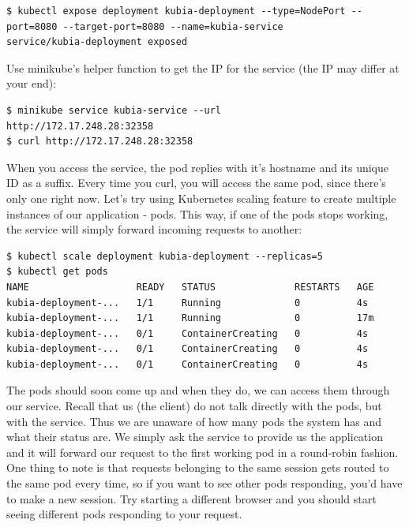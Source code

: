 \documentclass[a4paper,10pt]{article}
\begin{document}
\begin{lstlisting}[numbers=none, basicstyle=\mdseries]
$ kubectl expose deployment kubia-deployment --type=NodePort --port=8080 --target-port=8080 --name=kubia-service
service/kubia-deployment exposed
\end{lstlisting}

Use minikube's helper function to get the IP for the service (the IP may differ at your end):

\begin{lstlisting}[numbers=none, basicstyle=\mdseries]
$ minikube service kubia-service --url
http://172.17.248.28:32358
$ curl http://172.17.248.28:32358
\end{lstlisting}

When you access the service, the pod replies with it's hostname and its unique ID as a suffix. Every time you curl, you will access the same pod, since there's only one right now. Let's try using Kubernetes scaling feature to create multiple instances of our application - pods. This way, if one of the pods stops working, the service will simply forward incoming requests to another:

\newpage

\begin{lstlisting}[numbers=none, basicstyle=\mdseries]
$ kubectl scale deployment kubia-deployment --replicas=5
$ kubectl get pods
NAME                   READY   STATUS              RESTARTS   AGE
kubia-deployment-...   1/1     Running             0          4s
kubia-deployment-...   1/1     Running             0          17m
kubia-deployment-...   0/1     ContainerCreating   0          4s
kubia-deployment-...   0/1     ContainerCreating   0          4s
kubia-deployment-...   0/1     ContainerCreating   0          4s
\end{lstlisting}

The pods should soon come up and when they do, we can access them through our service. Recall that us (the client) do not talk directly with the pods, but with the service. Thus we are unaware of how many pods the system has and what their status are. We simply ask the service to provide us the application and it will forward our request to the first working pod in a round-robin fashion. One thing to note is that requests belonging to the same session gets routed to the same pod every time, so if you want to see other pods responding, you'd have to make a new session. Try starting a different browser and you should start seeing different pods responding to your request. 
\end{document}
